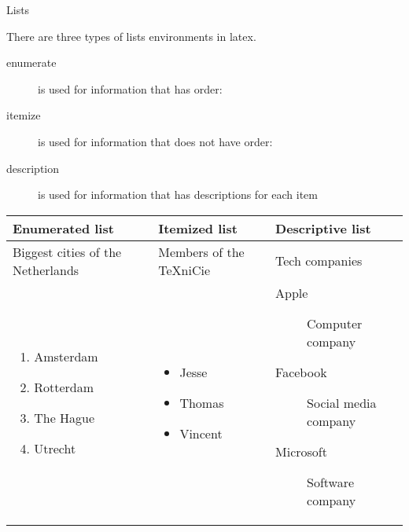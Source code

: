 \begin{frame}[fragile]{Lists}

There are three types of lists environments in latex.


\begin{description}
	\item[enumerate]  is used for information that has order:
	\item[itemize] is used for information that does not have order:
	\item[description] is used for information that has descriptions for each item
\end{description}
	\begin{tcolorbox}[width=13cm, title={Examples}, size=small]
	\begin{tabular}{m{3cm}| m{3cm} | m{5cm}}
		\textbf{Enumerated list} & \textbf{Itemized list} & \textbf{Descriptive list}\\
		\hline
		Biggest cities of the Netherlands &Members of the TeXniCie &   Tech companies\\
		\hline
		\begin{enumerate}[label=\arabic*)]
			\item Amsterdam 
			\item Rotterdam
			\item The Hague
			\item Utrecht
		\end{enumerate}
		&
		\begin{itemize}[label=\textbullet]
			\item Jesse 
			\item Thomas
			\item Vincent
		\end{itemize}
		& 
		\begin{description}
			\item[Apple] Computer company
			\item[Facebook] Social media company
			\item[Microsoft] Software company
		\end{description}
	\end{tabular}
	\end{tcolorbox}
\end{frame}
